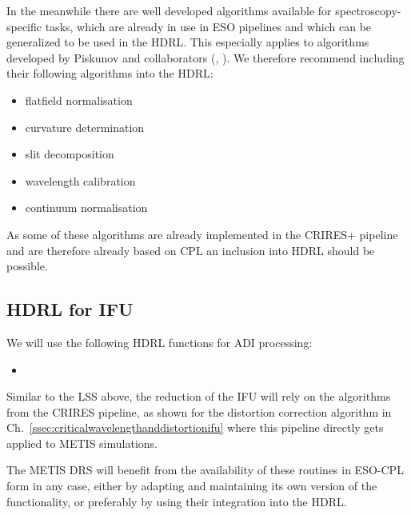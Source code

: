 In the meanwhile there are well developed algorithms available for spectroscopy-specific tasks, which are already in use in ESO pipelines and which can be generalized to be used in the \ac{HDRL}. This especially applies to algorithms developed by Piskunov and collaborators (\cite{pis21}, \cite{pis02}). We therefore recommend including their following algorithms into the \ac{HDRL}:
\begin{itemize}
    \item flatfield normalisation
    \item curvature determination
    \item slit decomposition
    \item wavelength calibration
    \item continuum normalisation
\end{itemize}
As some of these algorithms are already implemented in the \ac{CRIRES}+ pipeline
and are therefore already based on \ac{CPL} an inclusion into \ac{HDRL} should
be possible.

\subsection{HDRL for IFU}
\label{ssec:hdrllms}

We will use the following HDRL functions for ADI processing:
\begin{itemize}
    \item {}
\end{itemize}

Similar to the LSS above, the reduction of the IFU will rely on the algorithms
from the \ac{CRIRES} pipeline, as shown for the distortion correction algorithm
in Ch.~\ref{ssec:criticalwavelengthanddistortionifu} where this pipeline
directly gets applied to METIS simulations.

The METIS \ac{DRS} will benefit from the availability of these routines in ESO-CPL
form in any case, either by adapting and maintaining its own version of the
functionality, or preferably by using their integration into the HDRL.

